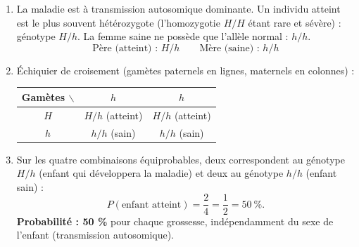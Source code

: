 \documentclass[11pt]{article}
\begin{document}
\begin{corrige}
\begin{enumerate}
\item La maladie est à transmission autosomique dominante. Un individu atteint est le plus souvent hétérozygote (l'homozygotie $H/H$ étant rare et sévère) : génotype $H/h$. La femme saine ne possède que l'allèle normal : $h/h$.
\[ \text{Père (atteint) : } H/h \qquad \text{Mère (saine) : } h/h \]
\item Échiquier de croisement (gamètes paternels en lignes, maternels en colonnes) :
\begin{center}
\begin{tabular}{|c|c|c|}
\hline
\rowcolor{popblueL} Gamètes $\backslash$ & $h$ & $h$ \\
\hline
$H$ & $H/h$ (atteint) & $H/h$ (atteint) \\
\hline
$h$ & $h/h$ (sain) & $h/h$ (sain) \\
\hline
\end{tabular}
\end{center}
\item Sur les quatre combinaisons équiprobables, deux correspondent au génotype $H/h$ (enfant qui développera la maladie) et deux au génotype $h/h$ (enfant sain) :
\[ P(\text{enfant atteint}) = \dfrac{2}{4} = \dfrac{1}{2} = 50\ \%. \]
\textbf{Probabilité : 50 \%} pour chaque grossesse, indépendamment du sexe de l'enfant (transmission autosomique).
\end{enumerate}
\end{corrige}
\end{document}
